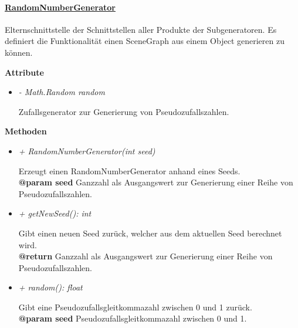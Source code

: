     \paragraph{\underline{RandomNumberGenerator}} \mbox{}\par
        Elternschnittstelle der Schnittstellen aller Produkte der Subgeneratoren.
        Es definiert die Funktionalität einen SceneGraph aus einem Object generieren zu können.\par
        
        \textbf{Attribute}	
        \begin{itemize}
            \item  \textit{- Math.Random random}
                \begin{leftbar}[0.9\linewidth]
                    Zufallsgenerator zur Generierung von Pseudozufallszahlen.\\
                \end{leftbar}   
        \end{itemize}

        \pagebreak

        \textbf{Methoden}
        \begin{itemize}
            \item  \textit{+ RandomNumberGenerator(int seed)}
                \begin{leftbar}[0.9\linewidth]
                    Erzeugt einen RandomNumberGenerator anhand eines Seeds.\\
                    \textbf{@param seed} Ganzzahl als Ausgangswert zur Generierung einer Reihe von Pseudozufallszahlen.
                \end{leftbar}   

            \item  \textit{+ getNewSeed(): int}
                \begin{leftbar}[0.9\linewidth]
                    Gibt einen neuen Seed zurück, welcher aus dem aktuellen Seed berechnet wird.\\
                    \textbf{@return} Ganzzahl als Ausgangswert zur Generierung einer Reihe von Pseudozufallszahlen.
                \end{leftbar}
            
            \item  \textit{+ random(): float}
                \begin{leftbar}[0.9\linewidth]
                    Gibt eine Pseudozufallsgleitkommazahl zwischen 0 und 1 zurück.\\
                    \textbf{@param seed} Pseudozufallsgleitkommazahl zwischen 0 und 1.
                \end{leftbar}   
        \end{itemize}

